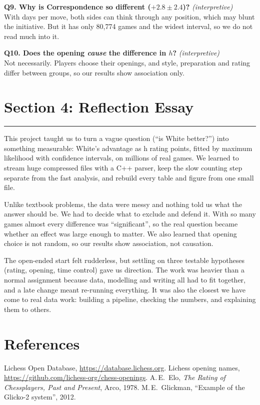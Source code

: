 \documentclass[11pt,a4paper]{article}
\begin{document}
\textbf{Q9. Why is Correspondence so different ($+2.8\pm2.4$)?} \emph{(interpretive)}\\
With days per move, both sides can think through any position, which may blunt the initiative.
But it has only 80,774 games and the widest interval, so we do not read much into it.

\textbf{Q10. Does the opening \emph{cause} the difference in $h$?} \emph{(interpretive)}\\
Not necessarily. Players choose their openings, and style, preparation and rating differ between
groups, so our results show association only.

\newpage

\section*{Section 4: Reflection Essay}
\hrule
This project taught us to turn a vague question (“is White better?”) into something measurable: White’s advantage as h rating points, fitted by maximum likelihood with confidence intervals, on millions of real games. We learned to stream huge compressed files with a C++ parser, keep the slow counting step separate from the fast analysis, and rebuild every table and figure from one small file.

Unlike textbook problems, the data were messy and nothing told us what the answer should be. We had to decide what to exclude and defend it. With so many games almost every difference was “significant”, so the real question became whether an effect was large enough to matter. We also learned that opening choice is not random, so our results show association, not causation.

The open-ended start felt rudderless, but settling on three testable hypotheses (rating, opening, time control) gave us direction. The work was heavier than a normal assignment because data, modelling and writing all had to fit together, and a late change meant re-running everything. It was also the closest we have come to real data work: building a pipeline, checking the numbers, and explaining them to others.

\section*{References}
{\small
Lichess Open Database, \url{https://database.lichess.org}.
Lichess opening names, \url{https://github.com/lichess-org/chess-openings}.
A.\,E.~Elo, \emph{The Rating of Chessplayers, Past and Present}, Arco, 1978.
M.\,E.~Glickman, ``Example of the Glicko-2 system'', 2012.
}
\end{document}
